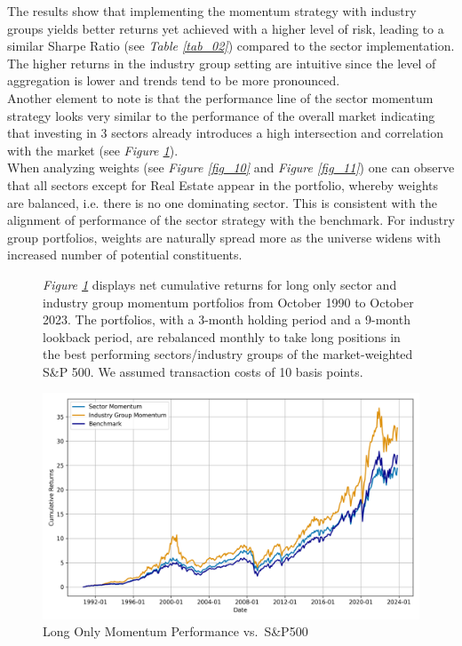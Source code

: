 \documentclass[a4paper,12pt,twoside]{article}
\begin{document}
    The results show that implementing the momentum strategy with industry groups yields better returns yet achieved with a higher level of risk, leading to a similar Sharpe Ratio (see \textit{Table \ref{tab_02}}) compared to the sector implementation. The higher returns in the industry group setting are intuitive since the level of aggregation is lower and trends tend to be more pronounced.\\
    
    Another element to note is that the performance line of the sector momentum strategy looks very similar to the performance of the overall market indicating that investing in 3 sectors already introduces a high intersection and correlation with the market (see \textit{Figure \ref{fig_01}}).\\
    
    When analyzing weights (see \textit{Figure \ref{fig_10}} and \textit{Figure \ref{fig_11}}) one can observe that all sectors except for Real Estate appear in the portfolio,  whereby weights are balanced, i.e. there is no one dominating sector. This is consistent with the alignment of performance of the sector strategy with the benchmark. For industry group portfolios, weights are naturally spread more as the universe widens with increased number of potential constituents. \\

\begin{figure}[H] 
        \caption{Long Only Momentum Performance vs.~S\&P500} 
    \label{fig_01}
    \textit{Figure \ref{fig_01}} displays net cumulative returns for long only sector and industry group momentum portfolios from October 1990 to October 2023. The portfolios, with a 3-month holding period and a 9-month lookback period, are rebalanced monthly to take long positions in the best performing sectors/industry groups of the market-weighted S\&P 500. We assumed transaction costs of 10 basis points.
\captionsetup{justification=centering}
\centerline{\includegraphics[width=1\textwidth]{Plots/strategy_plot.png}}
\end{figure}
\end{document}
